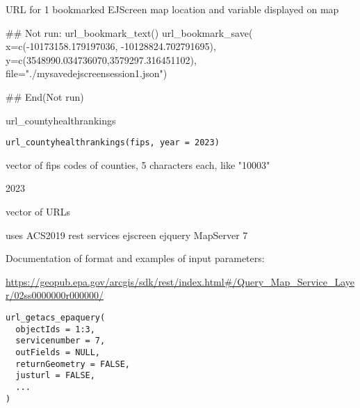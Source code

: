 \documentclass[a4paper]{book}
\begin{document}
%
\begin{Value}
URL for 1 bookmarked EJScreen map location and variable displayed on map
\end{Value}
%
\begin{SeeAlso}\relax
{}
\end{SeeAlso}
%
\begin{Examples}
\begin{ExampleCode}
## Not run: 
  url_bookmark_text()
  url_bookmark_save(
    x=c(-10173158.179197036, -10128824.702791695), 
    y=c(3548990.034736070,3579297.316451102), 
    file="./mysavedejscreensession1.json")
  
## End(Not run)
\end{ExampleCode}
\end{Examples}
%
\begin{Description}\relax
url\_countyhealthrankings
\end{Description}
%
\begin{Usage}
\begin{verbatim}
url_countyhealthrankings(fips, year = 2023)
\end{verbatim}
\end{Usage}
%
\begin{Arguments}
\begin{ldescription}
\item[\code{fips}] vector of fips codes of counties, 5 characters each, like "10003"

\item[\code{year}] 2023
\end{ldescription}
\end{Arguments}
%
\begin{Value}
vector of URLs
\end{Value}
%
\begin{Description}\relax
uses ACS2019 rest services ejscreen ejquery MapServer 7

Documentation of format and examples of input parameters:

\url{https://geopub.epa.gov/arcgis/sdk/rest/index.html\#/Query_Map_Service_Layer/02ss0000000r000000/}
\end{Description}
%
\begin{Usage}
\begin{verbatim}
url_getacs_epaquery(
  objectIds = 1:3,
  servicenumber = 7,
  outFields = NULL,
  returnGeometry = FALSE,
  justurl = FALSE,
  ...
)
\end{verbatim}
\end{Usage}
\end{document}

